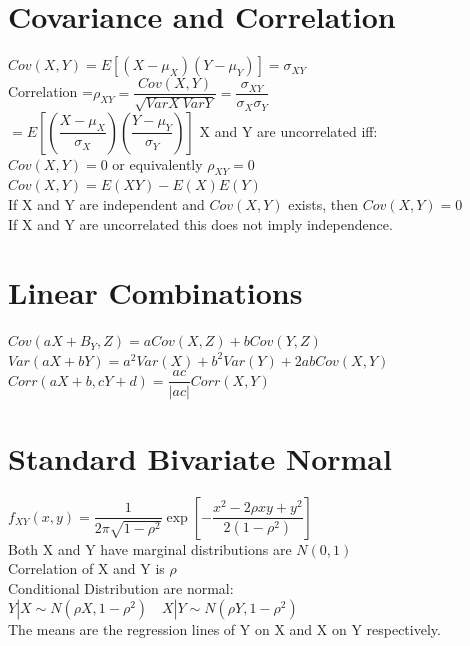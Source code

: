 \documentclass[openany]{book}
\begin{document}
\begin{flushleft}
\section{Covariance and Correlation}
$Cov(X,Y)=E[(X-\mu_X)(Y-\mu_Y)]=\sigma_{XY}$\\
Correlation =$\rho_{XY}=\dfrac{Cov(X,Y)}{\sqrt{VarX \ VarY}}=\dfrac{\sigma_{XY}}{\sigma_X \sigma_Y}$\\
$=E\left[ \left( \dfrac{X-\mu_X}{\sigma_X} \right) \left( \dfrac{Y-\mu_Y}{\sigma_Y} \right) \right]$\medbreak
X and Y are uncorrelated iff:\\
$Cov(X,Y)=0$ or equivalently $\rho_{XY}=0$\\
$Cov(X,Y)=E(XY)-E(X)E(Y)$\\
If X and Y are independent and $Cov(X,Y)$ exists, then $Cov(X,Y)=0$\\
If X and Y are uncorrelated this does not imply independence.\\
\section{Linear Combinations}
$Cov(aX+B_Y,Z)=aCov(X,Z)+bCov(Y,Z)$\medbreak
$Var(aX+bY)=a^2Var(X)+b^2Var(Y)+2abCov(X,Y)$\medbreak
$Corr(aX+b,cY+d)=\dfrac{ac}{|ac|}Corr(X,Y)$
\section{Standard Bivariate Normal}
$f_{XY}(x,y)=\dfrac{1}{2\pi\sqrt{1-\rho^2}}\exp{\left[-\dfrac{x^2-2\rho xy+y^2}{2(1-\rho^2)}\right]}$\\
Both X and Y have marginal distributions are $N(0,1)$\\
Correlation of X and Y is $\rho$\\
Conditional Distribution are normal:\\
$Y|X \sim N(\rho X,1-\rho^2) \quad X|Y \sim N(\rho Y, 1-\rho^2)$\\
The means are the regression lines of Y on X and X on Y respectively.

\end{flushleft}
\end{document}
